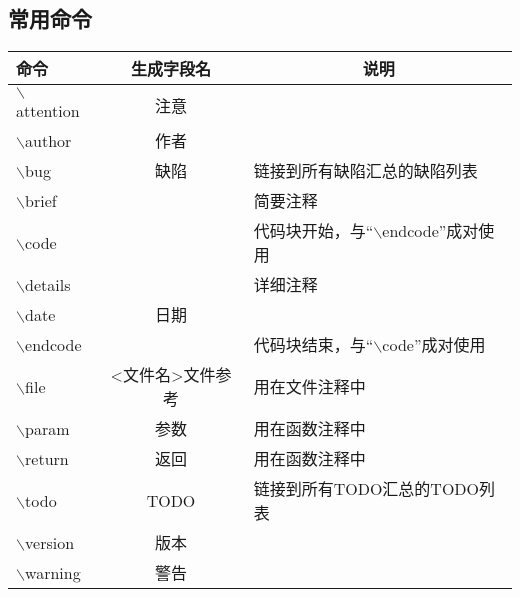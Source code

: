 \documentclass[11pt,a4paper]{article}
\begin{document}
\subsection{常用命令}
\begin{center}
\begin{tabular}{l c l}
\centering\textbf{命令} & \textbf{生成字段名} & \multicolumn{1}{c}{\textbf{说明}}\\
\hline
$\backslash$attention & 注意 &\\
$\backslash$author & 作者 &\\
$\backslash$bug & 缺陷 & 链接到所有缺陷汇总的缺陷列表\\
$\backslash$brief & & 简要注释\\
$\backslash$code & & 代码块开始，与“{$\backslash$endcode}”成对使用\\
$\backslash$details & & 详细注释\\
$\backslash$date & 日期 &\\
$\backslash$endcode & & 代码块结束，与“{$\backslash$code}”成对使用\\
$\backslash$file & <文件名>文件参考 & 用在文件注释中\\
$\backslash$param & 参数 & 用在函数注释中\\
$\backslash$return & 返回 & 用在函数注释中\\
$\backslash$todo & TODO & 链接到所有TODO汇总的TODO列表\\
$\backslash$version & 版本 &\\
$\backslash$warning & 警告 &
\end{tabular}
\end{center}
\end{document}
